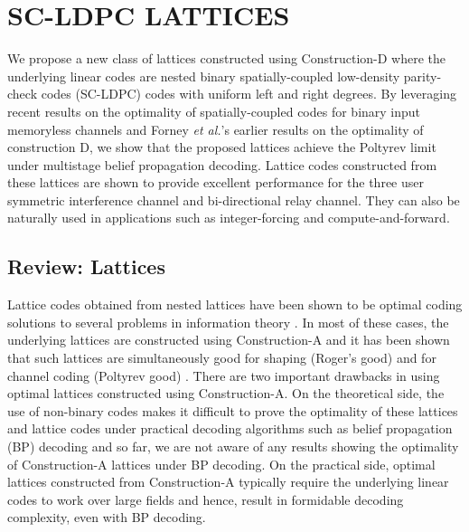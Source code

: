 %
%
%
%
\def \figures_path{./data/SCLDPC}
\chapter{\uppercase {SC-LDPC Lattices}}
\label{chap:SCLDPClattices}
We propose a new class of lattices constructed using Construction-D where the underlying linear codes are nested binary spatially-coupled low-density parity-check codes (SC-LDPC) codes with uniform left and right degrees. By leveraging recent results on the optimality of spatially-coupled codes for binary input memoryless channels and Forney {\em et al.}'s earlier results on the optimality of construction D, we show that the proposed lattices achieve the Poltyrev limit under multistage belief propagation decoding. Lattice codes constructed from these lattices are shown to provide excellent performance for the three user symmetric interference channel and bi-directional relay channel. They can also be naturally used in applications such as integer-forcing and compute-and-forward.

\section{Review: Lattices}
Lattice codes obtained from nested lattices have been shown to be optimal coding solutions to several problems in information theory \cite{erez05}. In most of these cases, the underlying lattices are constructed using Construction-A and it has been shown that such lattices are simultaneously good for shaping (Roger's good) and for channel coding (Poltyrev good) \cite{erez05}. There are two important drawbacks in using optimal lattices constructed using Construction-A. On the theoretical side, the use of non-binary codes makes it difficult to prove the optimality of these lattices and lattice codes under practical decoding algorithms such as belief propagation (BP) decoding and so far, we are not aware of any results showing the optimality of Construction-A lattices under BP decoding. On the practical side, optimal lattices constructed from Construction-A typically require the underlying linear codes to work over large fields and hence, result in formidable decoding complexity, even with BP decoding.

